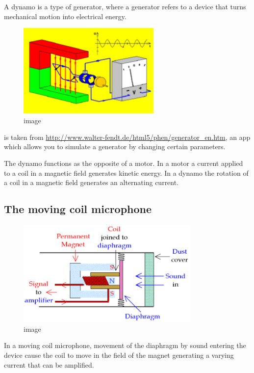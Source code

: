 \documentclass[
]{book}
\begin{document}
A dynamo is a type of generator, where a generator refers to a device
that turns mechanical motion into electrical energy.

\begin{figure}
\centering
\includegraphics[width=70mm,height=\textheight]{Figures/dynamo.png}
\caption{image}
\end{figure}

is taken from \url{http://www.walter-fendt.de/html5/phen/generator_en.htm},
an app which allows you to simulate a generator by changing certain
parameters.

The dynamo functions as the opposite of a motor. In a motor a current
applied to a coil in a magnetic field generates kinetic energy. In a
dynamo the rotation of a coil in a magnetic field generates an
alternating current.

\hypertarget{the-moving-coil-microphone}{%
\subsection{The moving coil microphone}\label{the-moving-coil-microphone}}

\begin{figure}
\centering
\includegraphics[width=90mm,height=\textheight]{Figures/coilMic.png}
\caption{image}
\end{figure}

In a moving coil microphone, movement of the diaphragm by sound entering
the device cause the coil to move in the field of the magnet generating
a varying current that can be amplified.
\end{document}
